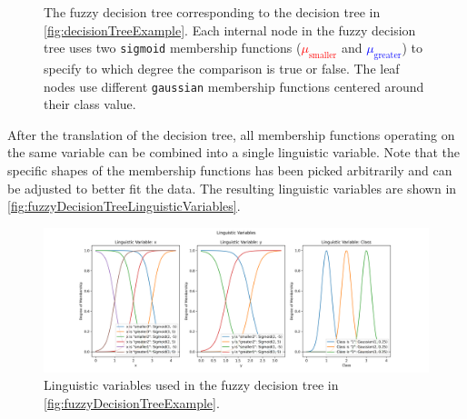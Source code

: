 \begin{figure}[h]

    \caption[Fuzzy decision tree created from the regular decision tree]{The fuzzy decision tree corresponding to the decision tree in \autoref{fig:decisionTreeExample}. Each internal node in the fuzzy decision tree uses two \texttt{sigmoid} membership functions (\textcolor{red}{$\mu_{\text{smaller}}$} and \textcolor{blue}{$\mu_{\text{greater}}$}) to specify to which degree the comparison is true or false. The leaf nodes use different \texttt{gaussian} membership functions centered around their class value.}

    \label{fig:fuzzyDecisionTreeExample}
\end{figure}

After the translation of the decision tree, all membership functions operating on the same variable can be combined into a single linguistic variable. Note that the specific shapes of the membership functions has been picked arbitrarily and can be adjusted to better fit the data. The resulting linguistic variables are shown in \autoref{fig:fuzzyDecisionTreeLinguisticVariables}.

\begin{figure}[H]
    \centering

    \includegraphics[width=\linewidth,trim={3.5cm 0 3.5cm 1cm},clip]{figures/ProofOfConcepts/fuzzy_sets.png}

    \caption[Linguistic variables for the converted fuzzy decision tree]{Linguistic variables used in the fuzzy decision tree in \autoref{fig:fuzzyDecisionTreeExample}.}
    \label{fig:fuzzyDecisionTreeLinguisticVariables}
\end{figure}

